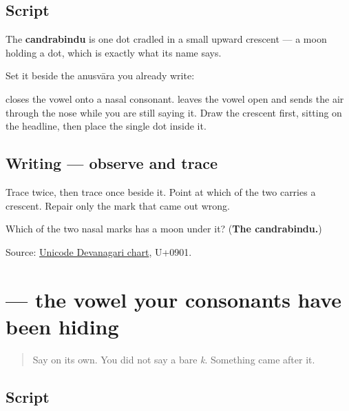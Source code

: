 \subsection*{Script}
\begin{quote}
\end{quote}

The \textbf{candrabindu} is one dot cradled in a small upward crescent — a moon holding a dot, which is exactly what its name says.

Set it beside the anusvāra you already write:

\textbf{} closes the vowel onto a nasal consonant. \textbf{} leaves the vowel open and sends the air through the nose while you are still saying it. Draw the crescent first, sitting on the headline, then place the single dot inside it.

\subsection*{Writing — observe and trace}

Trace \textbf{} twice, then trace \textbf{} once beside it. Point at which of the two carries a crescent. Repair only the mark that came out wrong.

\begin{tcolorbox}[breakable,colback=teal!4,colframe=teal!35!black,title={Before you move on}]
Which of the two nasal marks has a moon under it? (\textbf{The candrabindu.})

Source: \href{https://www.unicode.org/charts/PDF/U0900.pdf}{Unicode Devanagari chart}, U+0901.
\end{tcolorbox}
\section[\texorpdfstring{\mr{अ} (a)}{अ (a)}]{ — the vowel your consonants have been hiding}

\label{lesson:MR-W05-a-independent}



\begin{quote}
Say \textbf{} on its own. You did not say a bare \emph{k}. Something came after it.
\end{quote}

\subsection*{Script}
\begin{quote}
\end{quote}

